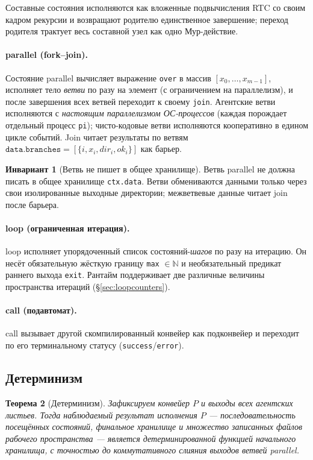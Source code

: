 \documentclass[11pt]{article}
\theoremstyle{plain}
\newtheorem{theorem}{Теорема}[section]
\theoremstyle{definition}
\newtheorem{invariant}[theorem]{Инвариант}
\theoremstyle{remark}
\newcommand{\code}[1]{\texttt{#1}}
\newcommand{\state}[1]{\textsf{#1}}
\newcommand{\Nat}{\mathbb{N}}
\begin{document}
Составные состояния исполняются как вложенные подвычисления RTC со своим кадром рекурсии
и возвращают родителю единственное завершение; переход родителя трактует весь составной
узел как одно Мур-действие.

\paragraph{\state{parallel} (fork--join).}
Состояние \state{parallel} вычисляет выражение \code{over} в массив
$[x_0,\dots,x_{m-1}]$, исполняет тело \emph{ветви} по разу на элемент (с ограничением на
параллелизм), и после завершения всех ветвей переходит к своему \code{join}. Агентские
ветви исполняются с \emph{настоящим параллелизмом ОС-процессов} (каждая порождает
отдельный процесс \code{pi}); чисто-кодовые ветви исполняются кооперативно в едином цикле
событий. Join читает результаты по ветвям $\code{data.branches} = [\{i, x_i,
\mathit{dir}_i, \mathit{ok}_i\}]$ как барьер.

\begin{invariant}[Ветвь не пишет в общее хранилище]\label{inv:branch}
Ветвь \state{parallel} не должна писать в общее хранилище \code{ctx.data}. Ветви
обмениваются данными только через свои изолированные выходные директории;
межветвевые данные читает join после барьера.
\end{invariant}

\paragraph{\state{loop} (ограниченная итерация).}
\state{loop} исполняет упорядоченный список состояний-\emph{шагов} по разу на итерацию.
Он несёт обязательную жёсткую границу \code{max} $\in \Nat$ и необязательный предикат
раннего выхода \code{exit}. Рантайм поддерживает две различные величины пространства
итераций (\S\ref{sec:loopcounters}).

\paragraph{\state{call} (подавтомат).}
\state{call} вызывает другой скомпилированный конвейер как подконвейер и переходит по его
терминальному статусу (\code{success}/\code{error}).

\subsection{Детерминизм}

\begin{theorem}[Детерминизм]\label{thm:determinism}
Зафиксируем конвейер $P$ и выходы всех агентских листьев. Тогда наблюдаемый результат
исполнения $P$ --- последовательность посещённых состояний, финальное хранилище и
множество записанных файлов рабочего пространства --- является детерминированной функцией
начального хранилища, с точностью до коммутативного слияния выходов ветвей \state{parallel}.
\end{theorem}
\end{document}
